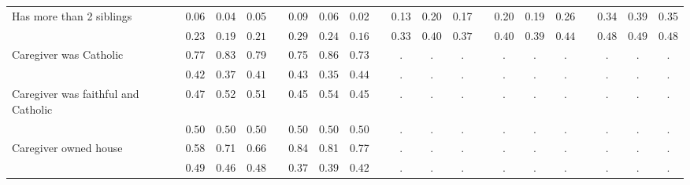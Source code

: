 \begin{center}
{\begin{longtable}{L{6cm} c c c p{.5cm} c c c p{.5cm} c c c p{.5cm} c c c p{.5cm} c c c}
 \quad Has more than 2 siblings & 0.06 &      0.04 &      0.05 & &      0.09 &      0.06 &      0.02 & &      0.13 &      0.20 &      0.17 & &      0.20 &      0.19 &      0.26 & &      0.34 &      0.39 &      0.35 \\*
 \quad & $\mathit{     0.23}$ & $\mathit{     0.19}$ & $\mathit{     0.21}$ & & $\mathit{     0.29}$ & $\mathit{     0.24}$ & $\mathit{     0.16}$ & & $\mathit{     0.33}$ & $\mathit{     0.40}$ & $\mathit{     0.37}$ & & $\mathit{     0.40}$ & $\mathit{     0.39}$ & $\mathit{     0.44}$ & & $\mathit{     0.48}$ & $\mathit{     0.49}$ & $\mathit{     0.48}$ \\[.2em]
 \quad Caregiver was Catholic & 0.77 &      0.83 &      0.79 & &      0.75 &      0.86 &      0.73 & &         . &         . &         . & &         . &         . &         . & &         . &         . &         . \\*
 \quad & $\mathit{     0.42}$ & $\mathit{     0.37}$ & $\mathit{     0.41}$ & & $\mathit{     0.43}$ & $\mathit{     0.35}$ & $\mathit{     0.44}$ & & $\mathit{        .}$ & $\mathit{        .}$ & $\mathit{        .}$ & & $\mathit{        .}$ & $\mathit{        .}$ & $\mathit{        .}$ & & $\mathit{        .}$ & $\mathit{        .}$ & $\mathit{        .}$ \\[.2em]
 \quad Caregiver was faithful and Catholic & 0.47 &      0.52 &      0.51 & &      0.45 &      0.54 &      0.45 & &         . &         . &         . & &         . &         . &         . & &         . &         . &         . \\*
 \quad & $\mathit{     0.50}$ & $\mathit{     0.50}$ & $\mathit{     0.50}$ & & $\mathit{     0.50}$ & $\mathit{     0.50}$ & $\mathit{     0.50}$ & & $\mathit{        .}$ & $\mathit{        .}$ & $\mathit{        .}$ & & $\mathit{        .}$ & $\mathit{        .}$ & $\mathit{        .}$ & & $\mathit{        .}$ & $\mathit{        .}$ & $\mathit{        .}$ \\[.2em]
 \quad Caregiver owned house & 0.58 &      0.71 &      0.66 & &      0.84 &      0.81 &      0.77 & &         . &         . &         . & &         . &         . &         . & &         . &         . &         . \\*
 \quad & $\mathit{     0.49}$ & $\mathit{     0.46}$ & $\mathit{     0.48}$ & & $\mathit{     0.37}$ & $\mathit{     0.39}$ & $\mathit{     0.42}$ & & $\mathit{        .}$ & $\mathit{        .}$ & $\mathit{        .}$ & & $\mathit{        .}$ & $\mathit{        .}$ & $\mathit{        .}$ & & $\mathit{        .}$ & $\mathit{        .}$ & $\mathit{        .}$ \\[.2em]

\end{longtable}}
\end{center}
